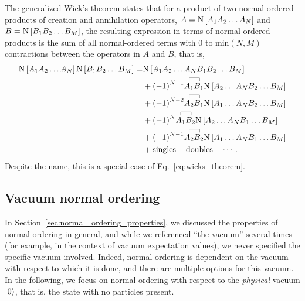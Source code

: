 The generalized Wick's theorem states that
for a product of two normal-ordered products of creation and annihilation operators,
$A=\text{N}\left[A_1 A_2 \ldots A_N\right]$ and $B=\text{N}\left[B_1 B_2 \ldots B_M\right]$,
the resulting expression in terms of normal-ordered products
is the sum of all normal-ordered terms with 0 to $\text{min}(N, M)$ contractions
between the operators in $A$ and $B$, that is,
\begin{equation}\label{eq:gen_wicks_theorem}
  \begin{split}
    \nogen{A_1 A_2 \ldots A_N} \nogen{B_1 B_2 \ldots B_M} = &
    \nogen{A_1 A_2 \ldots A_N B_1 B_2 \ldots B_M} \\
    & + {(-1)}^{N-1} \acontraction{}{A_1}{}{B_1} A_1 B_1 \nogen{A_2 \ldots A_N B_2 \ldots B_M} \\
    & + {(-1)}^{N-2} \acontraction{}{A_2}{}{B_1} A_2 B_1 \nogen{A_1 \ldots A_N B_2 \ldots B_M} \\
    & + {(-1)}^{N} \acontraction{}{A_1}{}{B_2} A_1 B_2 \nogen{A_2 \ldots A_N B_1 \ldots B_M} \\
    & + {(-1)}^{N-1} \acontraction{}{A_2}{}{B_2} A_2 B_2 \nogen{A_1 \ldots A_N B_1 \ldots B_M} \\
    & + \text{singles} + \text{doubles} + \cdots\,.
  \end{split}
\end{equation}
Despite the name, this is a special case of Eq.~\eqref{eq:wicks_theorem}.

\subsection{Vacuum normal ordering}

In Section~\ref{sec:normal_ordering_properties},
we discussed the properties of normal ordering in general,
and while we referenced ``the vacuum'' several times
(for example, in the context of vacuum expectation values),
we never specified the specific vacuum involved.
Indeed, normal ordering is dependent on the vacuum with respect to which it is done,
and there are multiple options for this vacuum.
In the following, we focus on normal ordering
with respect to the \textit{physical} vacuum $\ket{0}$,
that is, the state with no particles present.

